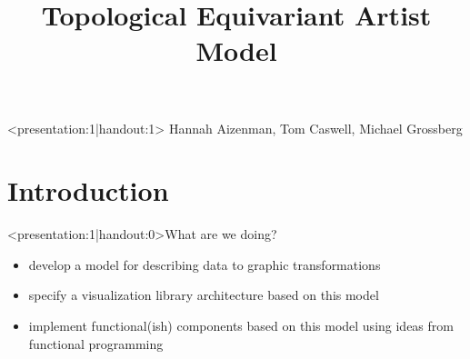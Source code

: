 \documentclass[xcolor={dvipsnames}, handout]{beamer}
\begin{document}
\title{Topological Equivariant Artist Model}

\begin{frame}<presentation:1|handout:1>
	\titlepage
    Hannah Aizenman, Tom Caswell, Michael Grossberg\\
\end{frame}

\section{Introduction}
\begin{frame}<presentation:1|handout:0>{What are we doing?}
    \begin{itemize}
        \item develop a model for describing data to graphic transformations
        \item specify a visualization library architecture based on this model
        \item implement functional(ish) components based on this model using ideas from functional programming
    \end{itemize}
\end{frame}
\end{document}
